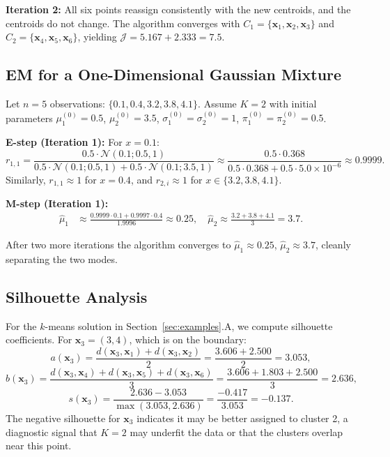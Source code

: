 \documentclass[conference]{IEEEtran}
\begin{document}
\textbf{Iteration 2:} All six points reassign consistently with the new centroids, and the centroids do not change. The algorithm converges with $C_1=\{\mathbf{x}_1,\mathbf{x}_2,\mathbf{x}_3\}$ and $C_2=\{\mathbf{x}_4,\mathbf{x}_5,\mathbf{x}_6\}$, yielding $\mathcal{J}=5.167 + 2.333 = 7.5$.

\subsection{EM for a One-Dimensional Gaussian Mixture}

Let $n=5$ observations: $\{0.1, 0.4, 3.2, 3.8, 4.1\}$. Assume $K=2$ with initial parameters $\mu_1^{(0)}=0.5$, $\mu_2^{(0)}=3.5$, $\sigma_1^{(0)}=\sigma_2^{(0)}=1$, $\pi_1^{(0)}=\pi_2^{(0)}=0.5$.

\textbf{E-step (Iteration 1):} For $x=0.1$:
\[
r_{1,1} = \frac{0.5 \cdot \mathcal{N}(0.1; 0.5, 1)}{0.5\cdot\mathcal{N}(0.1;0.5,1) + 0.5\cdot\mathcal{N}(0.1;3.5,1)} \approx \frac{0.5 \cdot 0.368}{0.5\cdot0.368 + 0.5\cdot 5.0 \times 10^{-6}} \approx 0.9999.
\]
Similarly, $r_{1,1}\approx1$ for $x=0.4$, and $r_{2,i}\approx1$ for $x \in \{3.2, 3.8, 4.1\}$.

\textbf{M-step (Iteration 1):}
\begin{align*}
\hat{\mu}_1 &\approx \frac{0.9999\cdot0.1 + 0.9997\cdot0.4}{1.9996} \approx 0.25, \quad \hat{\mu}_2 \approx \frac{3.2+3.8+4.1}{3} = 3.7.
\end{align*}

After two more iterations the algorithm converges to $\hat{\mu}_1 \approx 0.25$, $\hat{\mu}_2 \approx 3.7$, cleanly separating the two modes.

\subsection{Silhouette Analysis}

For the $k$-means solution in Section~\ref{sec:examples}.A, we compute silhouette coefficients. For $\mathbf{x}_3=(3,4)$, which is on the boundary:
\[
a(\mathbf{x}_3) = \frac{d(\mathbf{x}_3,\mathbf{x}_1)+d(\mathbf{x}_3,\mathbf{x}_2)}{2} = \frac{3.606+2.500}{2} = 3.053,
\]
\[
b(\mathbf{x}_3) = \frac{d(\mathbf{x}_3,\mathbf{x}_4)+d(\mathbf{x}_3,\mathbf{x}_5)+d(\mathbf{x}_3,\mathbf{x}_6)}{3} = \frac{3.606+1.803+2.500}{3} = 2.636,
\]
\[
s(\mathbf{x}_3) = \frac{2.636 - 3.053}{\max(3.053, 2.636)} = \frac{-0.417}{3.053} = -0.137.
\]
The negative silhouette for $\mathbf{x}_3$ indicates it may be better assigned to cluster 2, a diagnostic signal that $K=2$ may underfit the data or that the clusters overlap near this point.
\end{document}
